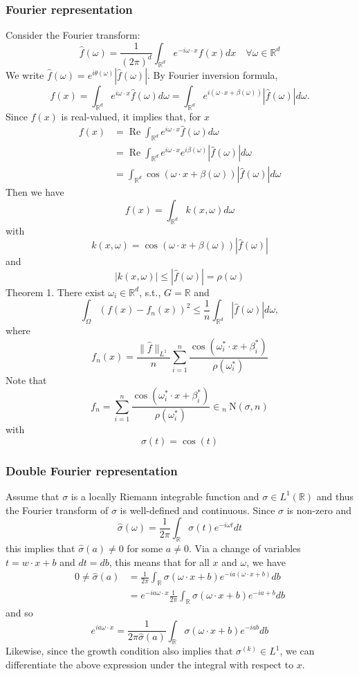 \documentclass[10pt]{article}
\begin{document}
\subsubsection{Fourier representation}
Consider the Fourier transform:
$$
\hat{f}(\omega)=\frac{1}{(2 \pi)^{d}} \int_{\mathbb{R}^{d}} e^{-i \omega \cdot x} f(x) d x \quad \forall \omega \in \mathbb{R}^{d}
$$
We write $\hat{f}(\omega)=e^{i \theta(\omega)}|\hat{f}(\omega)| .$ By Fourier inversion formula,
$$
f(x)=\int_{\mathbb{R}^{d}} e^{i \omega \cdot x} \hat{f}(\omega) d \omega=\int_{\mathbb{R}^{d}} e^{i(\omega \cdot x+\beta(\omega))}|\hat{f}(\omega)| d \omega .
$$
Since $f(x)$ is real-valued, it implies that, for $x$
$$
\begin{aligned}
f(x) &=\operatorname{Re} \int_{\mathbb{R}^{d}} e^{i \omega \cdot x} \hat{f}(\omega) d \omega \\
&=\operatorname{Re} \int_{\mathbb{R}^{d}} e^{i \omega \cdot x} e^{i \beta(\omega)}|\hat{f}(\omega)| d \omega \\
&=\int_{\mathbb{R}^{d}} \cos (\omega \cdot x+\beta(\omega))|\hat{f}(\omega)| d \omega
\end{aligned}
$$
Then we have
$$
f(x)=\int_{\mathbb{R}^{d}} k(x, \omega) d \omega
$$
with
$$
k(x, \omega)=\cos (\omega \cdot x+\beta(\omega))|\hat{f}(\omega)|
$$
and
$$
|k(x, \omega)| \leq|\hat{f}(\omega)|=\rho(\omega)
$$
Theorem 1. There exist $\omega_{i} \in \mathbb{R}^{d}$, s.t., $G=\mathbb{R}$ and
$$
\int_{\Omega}\left(f(x)-f_{n}(x)\right)^{2} \leq \frac{1}{n} \int_{\mathbb{R}^{d}}|\hat{f}(\omega)| d \omega,
$$
where
$$
f_{n}(x)=\frac{\|\hat{f}\|_{L^{1}}}{n} \sum_{i=1}^{n} \frac{\cos \left(\omega_{i}^{*} \cdot x+\beta_{i}^{*}\right)}{\rho\left(\omega_{i}^{*}\right)}
$$
Note that
$$
f_{n}=\sum_{i=1}^{n} \frac{\cos \left(\omega_{i}^{*} \cdot x+\beta_{i}^{*}\right)}{\rho\left(\omega_{i}^{*}\right)} \in{ }_{n} \mathrm{~N}(\sigma, n)
$$
with
$$
\sigma(t)=\cos (t)
$$

\subsubsection{Double Fourier representation}
Assume that $\sigma$ is a locally Riemann integrable function and $\sigma \in L^{1}(\mathbb{R})$ and thus the Fourier transform of $\sigma$ is well-defined and continuous. Since $\sigma$ is non-zero and
$$
\hat{\sigma}(\omega)=\frac{1}{2 \pi} \int_{\mathbb{R}} \sigma(t) e^{-i \omega t} d t
$$
this implies that $\hat{\sigma}(a) \neq 0$ for some $a \neq 0$. Via a change of variables $t=w \cdot x+b$ and $d t=d b$, this means that for all $x$ and $\omega$, we have
$$
\begin{aligned}
0 \neq \hat{\sigma}(a) &=\frac{1}{2 \pi} \int_{\mathbb{R}} \sigma(\omega \cdot x+b) e^{-i a(\omega \cdot x+b)} d b \\
&=e^{-i a \omega \cdot x} \frac{1}{2 \pi} \int_{\mathbb{R}} \sigma(\omega \cdot x+b) e^{-i a+b} d b
\end{aligned}
$$
and so
$$
e^{i a \omega \cdot x}=\frac{1}{2 \pi \hat{\sigma}(a)} \int_{\mathbb{R}} \sigma(\omega \cdot x+b) e^{-i a b} d b
$$
Likewise, since the growth condition also implies that $\sigma^{(k)} \in L^{1}$, we can differentiate the above expression under the integral with respect to $x$.
\end{document}
